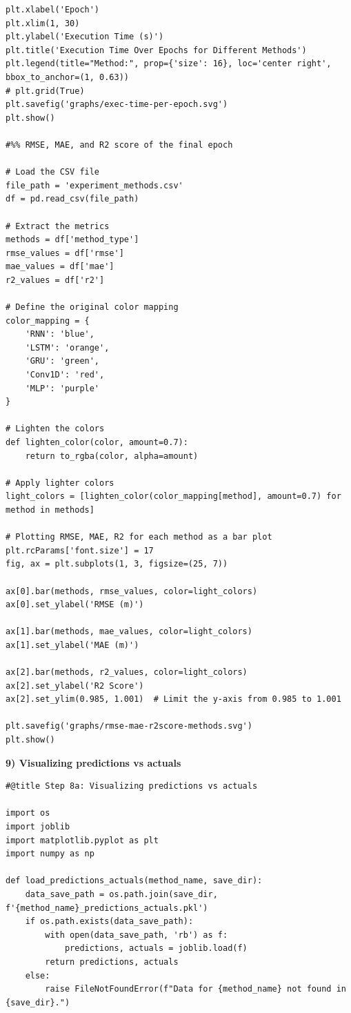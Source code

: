 \documentclass[journal,onecolumn]{IEEEtran}
\begin{document}
{\begin{appendices}
\begin{verbatim}
plt.xlabel('Epoch')
plt.xlim(1, 30)
plt.ylabel('Execution Time (s)')
plt.title('Execution Time Over Epochs for Different Methods')
plt.legend(title="Method:", prop={'size': 16}, loc='center right', bbox_to_anchor=(1, 0.63))
# plt.grid(True)
plt.savefig('graphs/exec-time-per-epoch.svg')
plt.show()

#%% RMSE, MAE, and R2 score of the final epoch

# Load the CSV file
file_path = 'experiment_methods.csv'
df = pd.read_csv(file_path)

# Extract the metrics
methods = df['method_type']
rmse_values = df['rmse']
mae_values = df['mae']
r2_values = df['r2']

# Define the original color mapping
color_mapping = {
    'RNN': 'blue',
    'LSTM': 'orange',
    'GRU': 'green',
    'Conv1D': 'red',
    'MLP': 'purple'
}

# Lighten the colors
def lighten_color(color, amount=0.7):
    return to_rgba(color, alpha=amount)

# Apply lighter colors
light_colors = [lighten_color(color_mapping[method], amount=0.7) for method in methods]

# Plotting RMSE, MAE, R2 for each method as a bar plot
plt.rcParams['font.size'] = 17
fig, ax = plt.subplots(1, 3, figsize=(25, 7))

ax[0].bar(methods, rmse_values, color=light_colors)
ax[0].set_ylabel('RMSE (m)')

ax[1].bar(methods, mae_values, color=light_colors)
ax[1].set_ylabel('MAE (m)')

ax[2].bar(methods, r2_values, color=light_colors)
ax[2].set_ylabel('R2 Score')
ax[2].set_ylim(0.985, 1.001)  # Limit the y-axis from 0.985 to 1.001

plt.savefig('graphs/rmse-mae-r2score-methods.svg')
plt.show()
\end{verbatim}

\textbf{9) Visualizing predictions vs actuals}
\begin{verbatim}
#@title Step 8a: Visualizing predictions vs actuals

import os
import joblib
import matplotlib.pyplot as plt
import numpy as np

def load_predictions_actuals(method_name, save_dir):
    data_save_path = os.path.join(save_dir, f'{method_name}_predictions_actuals.pkl')
    if os.path.exists(data_save_path):
        with open(data_save_path, 'rb') as f:
            predictions, actuals = joblib.load(f)
        return predictions, actuals
    else:
        raise FileNotFoundError(f"Data for {method_name} not found in {save_dir}.")


\end{verbatim}
\end{appendices}}
\end{document}
